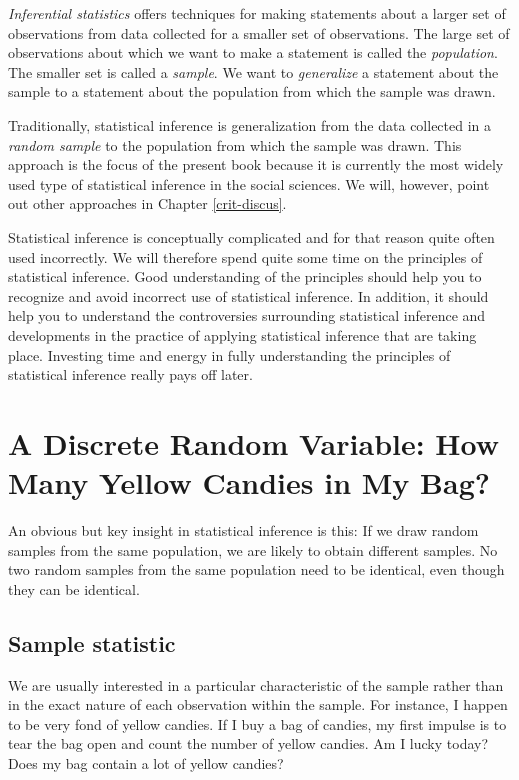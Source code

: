 \documentclass[a4paper]{book}
\theoremstyle{definition}
\theoremstyle{definition}
\theoremstyle{definition}
\theoremstyle{remark}
\begin{document}
\emph{Inferential statistics} offers techniques for making statements
about a larger set of observations from data collected for a smaller set
of observations. The large set of observations about which we want to
make a statement is called the \emph{population}. The smaller set is
called a \emph{sample}. We want to \emph{generalize} a statement about
the sample to a statement about the population from which the sample was
drawn.

Traditionally, statistical inference is generalization from the data
collected in a \emph{random sample} to the population from which the
sample was drawn. This approach is the focus of the present book because
it is currently the most widely used type of statistical inference in
the social sciences. We will, however, point out other approaches in
Chapter \ref{crit-discus}.

Statistical inference is conceptually complicated and for that reason
quite often used incorrectly. We will therefore spend quite some time on
the principles of statistical inference. Good understanding of the
principles should help you to recognize and avoid incorrect use of
statistical inference. In addition, it should help you to understand the
controversies surrounding statistical inference and developments in the
practice of applying statistical inference that are taking place.
Investing time and energy in fully understanding the principles of
statistical inference really pays off later.

\section{A Discrete Random Variable: How Many Yellow Candies in My
Bag?}\label{discreterandomvariable}

An obvious but key insight in statistical inference is this: If we draw
random samples from the same population, we are likely to obtain
different samples. No two random samples from the same population need
to be identical, even though they can be identical.

\subsection{Sample statistic}\label{sample-statistic}

We are usually interested in a particular characteristic of the sample
rather than in the exact nature of each observation within the sample.
For instance, I happen to be very fond of yellow candies. If I buy a bag
of candies, my first impulse is to tear the bag open and count the
number of yellow candies. Am I lucky today? Does my bag contain a lot of
yellow candies?
\end{document}
